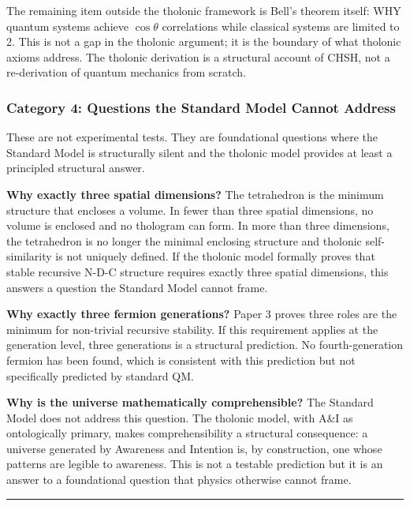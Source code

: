 \documentclass[
  11pt,
  letterpaper,
]{article}
\begin{document}
The remaining item outside the tholonic framework is Bell's theorem
itself: WHY quantum systems achieve \(\cos\theta\) correlations while
classical systems are limited to 2. This is not a gap in the tholonic
argument; it is the boundary of what tholonic axioms address. The
tholonic derivation is a structural account of CHSH, not a re-derivation
of quantum mechanics from scratch.

\subsubsection{Category 4: Questions the Standard Model Cannot
Address}\label{category-4-questions-the-standard-model-cannot-address}

These are not experimental tests. They are foundational questions where
the Standard Model is structurally silent and the tholonic model
provides at least a principled structural answer.

\textbf{Why exactly three spatial dimensions?} The tetrahedron is the
minimum structure that encloses a volume. In fewer than three spatial
dimensions, no volume is enclosed and no thologram can form. In more
than three dimensions, the tetrahedron is no longer the minimal
enclosing structure and tholonic self-similarity is not uniquely
defined. If the tholonic model formally proves that stable recursive
N-D-C structure requires exactly three spatial dimensions, this answers
a question the Standard Model cannot frame.

\textbf{Why exactly three fermion generations?} Paper 3 proves three
roles are the minimum for non-trivial recursive stability. If this
requirement applies at the generation level, three generations is a
structural prediction. No fourth-generation fermion has been found,
which is consistent with this prediction but not specifically predicted
by standard QM.

\textbf{Why is the universe mathematically comprehensible?} The Standard
Model does not address this question. The tholonic model, with A\&I as
ontologically primary, makes comprehensibility a structural consequence:
a universe generated by Awareness and Intention is, by construction, one
whose patterns are legible to awareness. This is not a testable
prediction but it is an answer to a foundational question that physics
otherwise cannot frame.

\begin{center}\rule{0.5\linewidth}{0.5pt}\end{center}
\end{document}
